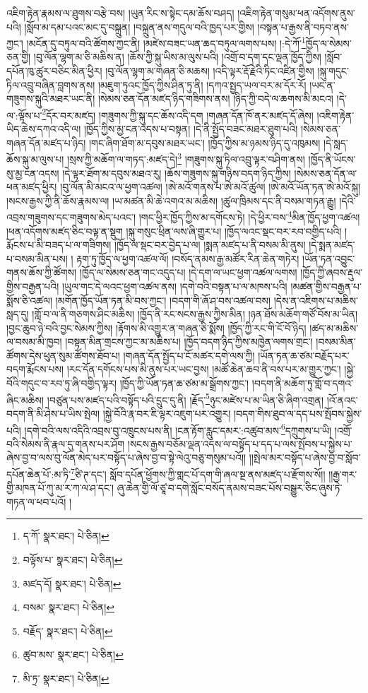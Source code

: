 འཇིག་རྟེན་རྣམས་ལ་ཐུགས་བརྩེ་བས། །ཡུན་རིང་ས་སྟེང་དམ་ཆོས་བཤད། །འཇིག་རྟེན་གསུམ་ཕན་འདོགས་ནུས་པའི། །སློབ་མ་དམ་པའང་མང་དུ་བསྐྲུན། །བསྐྲུན་ནས་གདུལ་བའི་ཁྱད་པར་གྱིས། །བསྟན་པ་རྒྱས་ནི་བཏབ་ནས་ཀྱང་། །མངོན་དུ་བཏུལ་བའི་ཚོགས་ཀྱང་ནི། །མཛེས་བཟང་ཡན་ཆད་བཏུལ་ལགས་པས། །:དེ་ཀོ་\footnote{ད་ཀོ་  སྣར་ཐང་།  པེ་ཅིན། }ཁྱོད་ལ་སེམས་ཅན་གྱི། །བུ་ལོན་ལྷག་མ་ཅི་མཆིས་ན། །ཆོས་ཀྱི་སྐུ་ཡིས་མ་ལུས་པའི། །འགྲོ་བ་དག་དང་ལྡན་ཁྱོད་ཀྱིས། །སློབ་དཔོན་ཁུ་ཚུར་བཅིང་མིན་ཕྱིར། །བུ་ལོན་ལྷག་མ་གཞན་ཅི་མཆས། །འདི་ལྟར་རྡོ་རྗེའི་ཏིང་འཛིན་གྱིས། །སྐུ་གདུང་ཏིལ་འབྲུ་བཞིན་བླགས་ནས། །མཇུག་ཏུའང་ཁྱོད་ཀྱིས་ཤིན་ཏུ་ནི། །དཀའ་སྤྱད་ཡལ་བར་མ་དོར་རོ། །ཡང་ན་གཟུགས་སྐུའི་མཐར་ཡང་ནི། །སེམས་ཅན་དོན་མཛད་ཉིད་གཟིགས་ནས། །ཉིད་ཀྱི་བདེ་ལ་ཆགས་མི་མངའ། །དེ་ལ་:ལྟོས་པ་\footnote{བལྟོས་པ་  སྣར་ཐང་།  པེ་ཅིན། }དོར་བར་མཛད། །གཟུགས་ཀྱི་སྐུ་དང་ཆོས་འདི་དག །གཞན་དོན་ཁོ་ནར་མཛད་དོ་ཞེས། །འཇིག་རྟེན་ཡིད་ཆེས་དཀའ་འདི་ལ། །ཁྱོད་ཀྱིས་མྱ་ངན་འདས་པ་བསྟན། །དེ་ནི་སྤྱོད་བཟང་མཐར་ཐུག་པའི། །སེམས་ཅན་གཞན་དོན་མཛད་པ་ཉིད། །གང་ཞིག་ཐོག་མ་དབུས་མཐར་ཡང་། །ཁྱོད་ཀྱིས་མ་ཉམས་ཉིད་དུ་འཁུམས། །དེ་སླད་ཆོས་སྐུ་མ་ལུས་པ། །སྲས་ཀྱི་མཆོག་ལ་གཏད་:མཛད་དེ།\footnote{མཛད་དོ།  སྣར་ཐང་།  པེ་ཅིན། } །གཟུགས་སྐུ་ཏིལ་འབྲུ་ལྟར་བཤིག་ནས། །ཁྱོད་ནི་ཡོངས་སུ་མྱ་ངན་འདས། །དེ་ལྟར་ཐོག་མ་དབུས་མཐའ་རུ། །ཆོས་གཟུགས་སྐུ་གཉིས་བདག་ཉིད་ཀྱིས། །སེམས་ཅན་དོན་ལ་ཕན་མཛད་ཕྱིར། །བུ་ལོན་མི་མངའ་ལ་ཕྱག་འཚལ། །ཨེ་མའོ་གནས་པ་ཨེ་མའོ་ཚུལ། །ཨེ་མའོ་ཡོན་ཏན་ཨེ་མའོ་སྐུ། །སངས་རྒྱས་ཀྱི་ནི་ཆོས་རྣམས་ལ། །ཡ་མཚན་མི་ཆེ་འགའ་མ་མཆིས། །ཚུལ་ཁྲིམས་དང་ནི་བསམ་གཏན་རྒྱུ། །དེའི་འབྲས་གཟུགས་དང་གཟུགས་མེད་པའང་། །གང་ཕྱིར་ཁྱོད་ཀྱིས་མ་དགོངས་ཏེ། །དེ་ཕྱིར་བས་\footnote{བསམ་  སྣར་ཐང་།  པེ་ཅིན། }མིན་ཁྱོད་ཕྱག་འཚལ། །ཕན་འདོགས་མཛད་ཅིང་བལྟ་ན་སྡུག །སྐུ་གསུང་ཕྲིན་ལས་ཞི་གྱུར་པ། །ཁྱོད་ལའང་སྡང་བར་རབ་བགྱིད་པའི། །རྨོངས་པ་མི་བཟད་པ་ལ་གཟིགས། །ཁྱོད་ལ་སྡང་བར་བྱེད་པ་ལ། །སྨན་མཛད་པ་ནི་བསམ་མི་ནུས། །དེ་སྨན་མཛད་པ་བསམ་མིན་པས། །
རྟག་ཏུ་ཁྱོད་ལ་ཕྱག་འཚལ་ལོ། །བསོད་ནམས་རྒྱ་མཚོར་རིན་ཆེན་གཏེར། །ཡོན་ཏན་འབྱུང་གནས་ཆོས་ཀྱི་ཚོགས། །ཁྱོད་ལ་སེམས་ཅན་གང་འདུད་པ། །དེ་དག་ལ་ཡང་ཕྱག་འཚལ་ལགས། །ཁྱོད་ཀྱི་ཞབས་རྡུལ་གྱིས་བརྒྱན་པའི། །ཡུལ་གང་དེ་ལའང་ཕྱག་འཚལ་ནས། །དགེ་བའི་བསྟན་པ་ལ་མཁས་པའི། །མཚན་གྱིས་བརྒྱན་པ་སྨོས་ཅི་འཚལ། །མགོན་ཁྱོད་ཡོན་ཏན་མི་བས་ཀྱང་། །བདག་གི་ཞོ་ཤ་བས་འཚལ་བས། །དེས་ན་འཇིགས་པ་མཆིས་སླད་དུ། །གློ་བ་ལ་ནི་གཅགས་ཤིང་མཆིས། །ཁྱོད་ནི་རང་སངས་རྒྱས་ཀྱིས་མིན། །ཉན་ཐོས་མཆོག་གཙོ་བོས་མ་ཡིན། །བྱང་ཆུབ་ཉེ་བའི་བྱང་སེམས་ཀྱིས། །རྟོགས་མི་འགྱུར་ན་གཞན་ཅི་སྨོས། །ཁྱོད་ཀྱི་རང་གི་ངོ་བོ་ཉིད། །ཚད་མ་མཆིས་ལ་བསམ་མི་ཁྱབ། །བསྟན་མིན་གྲངས་ཀྱང་མ་མཆིས་པ། །ཁྱོད་བདག་ཉིད་ཀྱིས་མཁྱེན་ལགས་གྲང་། །བསམ་མིན་ཚོགས་དེས་ཕུན་སུམ་ཚོགས་ཐོབ་པ། །གཞན་དོན་སྤྱོད་པ་ངོ་མཚར་དགེ་ལས་ཀྱི། །ཡོན་ཏན་ཆ་ཙམ་བརྗོད་པར་བདག་རྨོངས་པས། །རང་དོན་དགོངས་པས་མི་ནུས་པར་ཡང་བྱས། །མཚོ་ཆེན་ཆབ་ནི་བས་པར་མ་གྱུར་ཀྱང་། །སྐྱེ་བོའི་གདུང་བ་རབ་ཏུ་ཞི་བགྱིད་ལྟར། །ཁྱོད་ཀྱི་ཡོན་ཏན་ཆ་ཙམ་མ་སྒྲོགས་ཀྱང་། །བདག་ནི་མཆོག་ཏུ་གློ་བ་དགའ་ཞིང་མཆིས། །བཙུན་པས་མཛད་པའི་བསྟོད་པའི་དྲུང་དུ་ནི། །རྗོད་\footnote{བརྗོད་  སྣར་ཐང་།  པེ་ཅིན། }ཉུང་མཛེས་པ་མ་ཡིན་ཅི་ཞིག་འགྲན། །འོ་ནའང་བདག་ནི་མི་ཤེས་པ་ཡིས་སྤེལ། །སྐྱེ་བོའི་རྣ་བར་ཇི་ལྟར་འཇུག་པར་འགྱུར། །བདག་གིས་ཐུབ་ལ་དད་པས་སྤོབས་སྐྱེས་པའི། །དགེ་བའི་ལས་འདིའི་འབྲས་བུ་འཁྲུངས་པས་ནི། །ངན་རྟོག་རླུང་དམར་:འཚུབ་མས་\footnote{ཚུབ་མས་  སྣར་ཐང་།  པེ་ཅིན། }དཀྲུགས་པ་ཡི། །འགྲོ་བའི་སེམས་ནི་རྣལ་དུ་གནས་པར་ཤོག །སངས་རྒྱས་བཅོམ་ལྡན་འདས་ལ་བསྟོད་པ་དད་པ་ལས་སྤོབས་པ་སྐྱེས་པ་ཞེས་བྱ་བ་ལས་བུ་ལོན་མེད་པར་བསྟོད་པ་ཞེས་བྱ་བ་སྟེ་ལེའུ་བཅུ་གསུམ་པའོ།། །།སྤེལ་མར་བསྟོད་པ་ཞེས་བྱ་བ་སློབ་དཔོན་ཆེན་པོ་:མ་ཏི་\footnote{མི་ཏྲ་  སྣར་ཐང་།  པེ་ཅིན། }ཙི་ཊ་དང་། སློབ་དཔོན་ཕྱོགས་ཀྱི་གླང་པོ་དག་གི་ཞལ་སྔ་ནས་མཛད་པ་རྫོགས་སོ།། །།རྒྱ་གར་གྱི་མཁན་པོ་ཀུ་མ་ར་ཀ་ལ་ཤ་དང་། ཞུ་ཆེན་གྱི་ལོ་ཙཱ་བ་དགེ་སློང་བསོད་ནམས་བཟང་པོས་བསྒྱུར་ཅིང་ཞུས་ཏེ་གཏན་ལ་ཕབ་པའོ། ། 